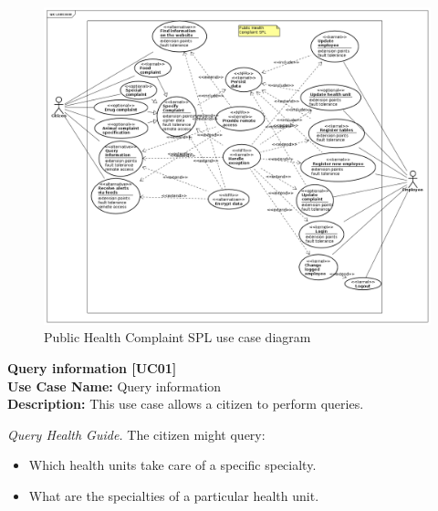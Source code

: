 \documentclass[11pt,twoside]{article}
\begin{document}
\begin{figure}[h!t!b!]
   \centering
   \includegraphics[scale=0.4]{figs/hw-usecase.png}
   \caption{Public Health Complaint SPL use case diagram}
   \label{fig:usecase}
\end{figure}


\textbf{Query information [UC01]}\\
\textbf{Use Case Name:} Query information\\
\textbf{Description:} This use case allows a citizen to perform queries.

\textit{Query Health Guide.} The citizen might query:
\begin{itemize}
\item Which health units take care of a specific specialty.
\item What are the specialties of a particular health unit.
\end{itemize}
\end{document}
